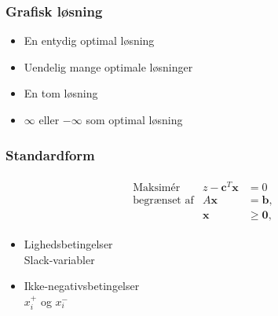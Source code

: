 %
%
%
%
%
%
%

\begin{frame}
\frametitle{Grafisk løsning}
\begin{itemize}
\item En entydig optimal løsning
\item Uendelig mange optimale løsninger 
\item En tom løsning
\item $\infty$ eller $-\infty$ som optimal løsning  
\end{itemize}
\end{frame}

\begin{frame}
\frametitle{Standardform}
\begin{align*}
\begin{array}{lrl}
\text{Maksimér}		&z - \textbf{c}^T\textbf{x}	&	=0		\\
\text{begrænset af}	&A\textbf{x}	&=\mathbf{b},	\\
					&\mathbf{x}				&\geq \mathbf{0},
\end{array}
\end{align*}
\begin{itemize}
\item Lighedsbetingelser \\
 		Slack-variabler
\item Ikke-negativsbetingelser \\ 
		$x_i^+$ og $x_i^-$
\end{itemize}
\end{frame}

